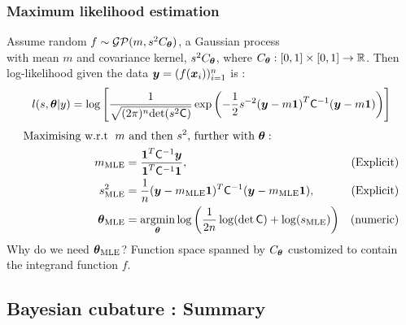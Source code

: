 \documentclass[10pt,compress,xcolor={usenames,dvipsnames}]{beamer} %
\newcommand{\bm}[1]{\boldsymbol{#1}}
\newcommand{\MLE}{\text{MLE}}
\newcommand{\vthetaMLE}{{\vtheta}_{\MLE}}
\begin{document}
\begin{frame}
\frametitle{Maximum likelihood estimation}
\vspace*{-6ex}
\alert{Assume random}
$f \sim \mathcal{GP} (m, s^2C_{\boldsymbol{\theta}})$,
a \alert{Gaussian process}
\\
\; with mean $m$ and covariance kernel, $s^2C_{\boldsymbol{\theta}}$, where $C_{\boldsymbol{\theta}}:[0,1] \times [0,1] \to \mathbb{R}$.
Then log-likelihood given the data $\boldsymbol{y} = (f(\boldsymbol{x}_i))_{i=1}^{n}$ is :
\vspace*{-2.0ex}
\begin{align*}
\displaystyle
l(s,\vtheta|y)=
\log
\left[
\frac{1}
{\sqrt{(2\pi)^n\text{det}(s^2\mC)}}
\exp{\left(
-\frac{1}{2}s^{-2}{(\vy-m\bm{1})}^T \mC^{-1} (\vy-m\bm{1})
\right)}
\right]
\end{align*}
\pause
\vspace{-4ex}
\begin{align*}
\text{Maximising w.r.t }\; m & \text{ and then $s^2$, further with $\vtheta$}: \;
\\
m_{\MLE} &= \frac{\bm{1}^T \mC^{-1} \vy}{\bm{1}^T \mC^{-1} \bm{1}}, & \text{(Explicit)}
\\
s^2_{\MLE} &=
\frac{1}{n} (\vy-m_{\MLE}\bm{1})^T \mC^{-1} (\vy-m_{\MLE}\bm{1})  , & \text{(Explicit)}
\\
\vthetaMLE &= \argmin_{\vtheta}
\log
\left(
\frac{1}{2n} \log(\det \mC) + \log(s_\MLE)
\right)
 & \text{(numeric)}
\end{align*}
\pause %
\alert{Why do we need $\vtheta_{\MLE}$?} \quad Function space spanned by $C_{\boldsymbol{\theta}}$ customized to contain the integrand function $f$.
\end{frame}












\subsection{Bayesian cubature : Summary}
\end{document}
